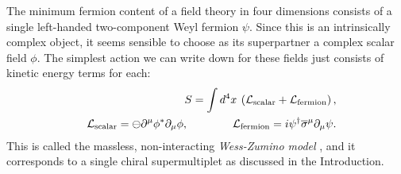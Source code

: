 \documentclass[12pt]{article}
\def\BDpos{}
\def\BDpos{-}
\def\BDpos{\oplus}
\def\BDpos{\ominus}
\def\beq{\begin{eqnarray}}
\def\eeq{\end{eqnarray}}
\def\lagr{{\cal L}}
\def\sigmabar{\overline\sigma}
\begin{document}
The minimum fermion content of a field theory in four dimensions consists
of a single left-handed two-component Weyl fermion $\psi$. Since this is
an intrinsically complex object, it seems sensible to choose as its
superpartner a complex scalar field $\phi$. The simplest action we can
write down for these fields just consists of kinetic energy terms for
each: 
\beq
&&S = \int d^4x\>
\left (\lagr_{\rm scalar} + \lagr_{\rm fermion}\right ) ,
\label{Lwz} \\
&&\lagr_{\rm scalar} = 
  \BDpos \partial^\mu \phi^* \partial_\mu \phi ,
\qquad\qquad
\lagr_{\rm fermion} = 
  i \psi^\dagger \sigmabar^\mu \partial_\mu \psi .
\eeq
This is called the massless, non-interacting {\it Wess-Zumino model}
\cite{WessZumino}, and it corresponds to a single chiral supermultiplet as
discussed in the Introduction. 
\end{document}
